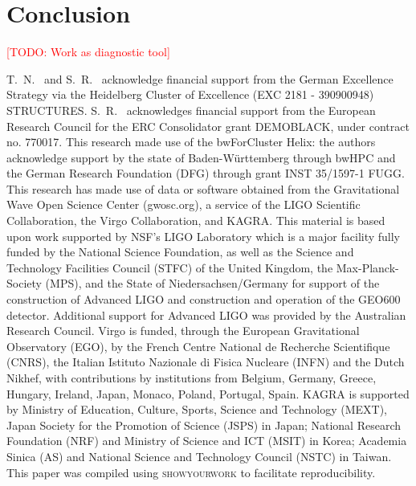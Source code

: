 \documentclass[twocolumn]{aastex631}
\newcommand{\todo}[1]{\textcolor{red}{[TODO: #1]}}
\begin{document}
\section{Conclusion}
\label{sec:conclusion}

\todo{Work as diagnostic tool}

\begin{acknowledgments}

T.~N.~ and S.~R.~ acknowledge financial support from the German Excellence Strategy via the Heidelberg Cluster of Excellence (EXC 2181 - 390900948) STRUCTURES.
S.~R.~ acknowledges financial support from the European Research Council for the ERC Consolidator grant DEMOBLACK, under contract no. 770017. 
This research made use of the bwForCluster Helix: the authors acknowledge support by the state of Baden-Württemberg through bwHPC and the German Research Foundation (DFG) through grant INST 35/1597-1 FUGG.
This research has made use of data or software obtained from the Gravitational Wave Open Science Center (gwosc.org), a service of the LIGO Scientific Collaboration, the Virgo Collaboration, and KAGRA. This material is based upon work supported by NSF's LIGO Laboratory which is a major facility fully funded by the National Science Foundation, as well as the Science and Technology Facilities Council (STFC) of the United Kingdom, the Max-Planck-Society (MPS), and the State of Niedersachsen/Germany for support of the construction of Advanced LIGO and construction and operation of the GEO600 detector. Additional support for Advanced LIGO was provided by the Australian Research Council. Virgo is funded, through the European Gravitational Observatory (EGO), by the French Centre National de Recherche Scientifique (CNRS), the Italian Istituto Nazionale di Fisica Nucleare (INFN) and the Dutch Nikhef, with contributions by institutions from Belgium, Germany, Greece, Hungary, Ireland, Japan, Monaco, Poland, Portugal, Spain. KAGRA is supported by Ministry of Education, Culture, Sports, Science and Technology (MEXT), Japan Society for the Promotion of Science (JSPS) in Japan; National Research Foundation (NRF) and Ministry of Science and ICT (MSIT) in Korea; Academia Sinica (AS) and National Science and Technology Council (NSTC) in Taiwan.
This paper was compiled using \textsc{showyourwork} \cite{Luger2021} to facilitate reproducibility.

\end{acknowledgments}


\end{document}
